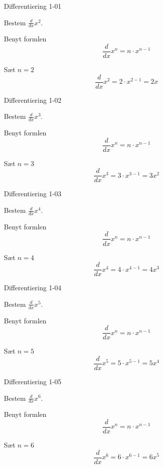 \documentclass{article}
\begin{document}
\tableofcontents
\newpage

\begin{exercise}{Differentiering 1-01}

Bestem $\frac{d}{dx} x^2$.


\hint

Benyt formlen
\[
\frac{d}{dx} x^n = n \cdot x^{n - 1}
\]

\hint

Sæt $n = 2$
\[
\frac{d}{dx} x^2 = 2 \cdot x^{2 - 1} = 2 x
\]
\end{exercise}

\begin{exercise}{Differentiering 1-02}

Bestem $\frac{d}{dx} x^3$.


\hint

Benyt formlen
\[
\frac{d}{dx} x^n = n \cdot x^{n - 1}
\]

\hint

Sæt $n = 3$
\[
\frac{d}{dx} x^3 = 3 \cdot x^{3 - 1} = 3 x^2
\]
\end{exercise}

\begin{exercise}{Differentiering 1-03}

Bestem $\frac{d}{dx} x^4$.


\hint

Benyt formlen
\[
\frac{d}{dx} x^n = n \cdot x^{n - 1}
\]

\hint

Sæt $n = 4$
\[
\frac{d}{dx} x^4 = 4 \cdot x^{4 - 1} = 4 x^3
\]
\end{exercise}

\begin{exercise}{Differentiering 1-04}

Bestem $\frac{d}{dx} x^5$.


\hint

Benyt formlen
\[
\frac{d}{dx} x^n = n \cdot x^{n - 1}
\]

\hint

Sæt $n = 5$
\[
\frac{d}{dx} x^5 = 5 \cdot x^{5 - 1} = 5 x^4
\]
\end{exercise}

\begin{exercise}{Differentiering 1-05}

Bestem $\frac{d}{dx} x^6$.


\hint

Benyt formlen
\[
\frac{d}{dx} x^n = n \cdot x^{n - 1}
\]

\hint

Sæt $n = 6$
\[
\frac{d}{dx} x^6 = 6 \cdot x^{6 - 1} = 6 x^5
\]
\end{exercise}
\end{document}
